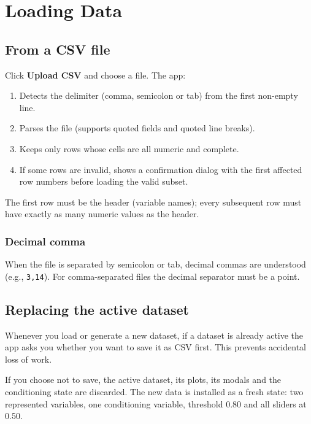 \documentclass[11pt,a4paper]{article}
\begin{document}
\section{Loading Data}

\subsection{From a CSV file}

Click \textbf{Upload CSV} and choose a file. The app:

\begin{enumerate}[leftmargin=1.4em]
  \item Detects the delimiter (comma, semicolon or tab) from the first non-empty line.
  \item Parses the file (supports quoted fields and quoted line breaks).
  \item Keeps only rows whose cells are all numeric and complete.
  \item If some rows are invalid, shows a confirmation dialog with the first affected row numbers before loading the valid subset.
\end{enumerate}

The first row must be the header (variable names); every subsequent row must have exactly as many numeric values as the header.

\subsubsection*{Decimal comma}

When the file is separated by semicolon or tab, decimal commas are understood (e.g., \texttt{3,14}). For comma-separated files the decimal separator must be a point.

\subsection{Replacing the active dataset}

Whenever you load or generate a new dataset, if a dataset is already active the app asks you whether you want to save it as CSV first. This prevents accidental loss of work.

\begin{warnbox}
If you choose not to save, the active dataset, its plots, its modals and the conditioning state are discarded. The new data is installed as a fresh state: two represented variables, one conditioning variable, threshold 0.80 and all sliders at 0.50.
\end{warnbox}
\end{document}
